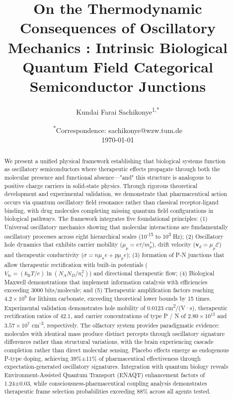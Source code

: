 \documentclass{article}
\title{\textbf{On the Thermodynamic Consequences of Oscillatory Mechanics : Intrinsic Biological Quantum Field Categorical Semiconductor Junctions}}
\author{
    Kundai Farai Sachikonye\textsuperscript{1,*}
}
\date{
    \textsuperscript{*}Correspondence: sachikonye@wzw.tum.de\\[1em]
    \today
}
\newcommand{\kB}{k_\mathrm{B}}
\theoremstyle{definition}
\theoremstyle{remark}
\begin{document}
\maketitle

\begin{abstract}
We present a unified physical framework establishing that biological systems function as oscillatory semiconductors where therapeutic effects propagate through both the molecular presence and functional absence—"and" this structure is analogous to positive charge carriers in solid-state physics. Through rigorous theoretical development and experimental validation, we demonstrate that pharmaceutical action occurs via quantum oscillatory field resonance rather than classical receptor-ligand binding, with drug molecules completing missing quantum field configurations in biological pathways. The framework integrates five foundational principles: (1) Universal oscillatory mechanics showing that molecular interactions are fundamentally oscillatory processes across eight hierarchical scales (10\textsuperscript{-15} to 10\textsuperscript{3} Hz); (2) Oscillatory hole dynamics that exhibits carrier mobility ($\mu_p = e\tau/m_p^*$), drift velocity ($\mathbf{v}_d = \mu_p \mathcal{E}$) and therapeutic conductivity ($\sigma = n\mu_n e + p\mu_p e$); (3) formation of P-N junctions that allow therapeutic rectification with built-in potentials ($V_{bi} = (\kB T/e)\ln(N_A N_D/n_i^2)$) and directional therapeutic flow; (4) Biological Maxwell demonstrations that implement information catalysis with efficiencies exceeding 3000 bits/molecule; and (5) Therapeutic amplification factors reaching $4.2 \times 10^9$ for lithium carbonate, exceeding theoretical lower bounds by 15 times. Experimental validation demonstrates hole mobility of 0.0123 cm\textsuperscript{2}/(V·s), therapeutic rectification ratios of 42.1, and carrier concentrations of type P / N of $2.80 \times 10^{12}$ and $3.57 \times 10^7$ cm\textsuperscript{-3}, respectively. The olfactory system provides paradigmatic evidence: molecules with identical mass produce distinct percepts through oscillatory signature differences rather than structural variations, with the brain experiencing cascade completion rather than direct molecular sensing. Placebo effects emerge as endogenous P-type doping, achieving 39\%±11\% of pharmaceutical effectiveness through expectation-generated oscillatory signatures. Integration with quantum biology reveals Environment-Assisted Quantum Transport (ENAQT) enhancement factors of 1.24±0.03, while consciousness-pharmaceutical coupling analysis demonstrates therapeutic frame selection probabilities exceeding 88\% across all agents tested. 
\end{abstract}
\end{document}

